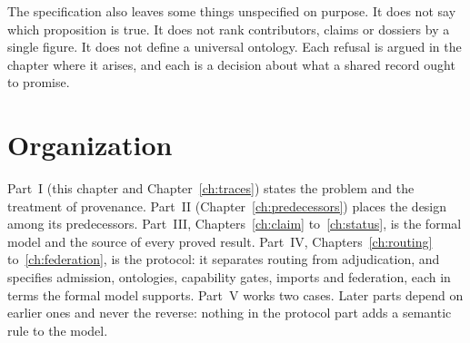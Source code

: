 The specification also leaves some things unspecified on purpose. It does not say which proposition is true. It does not rank contributors, claims or dossiers by a single figure. It does not define a universal ontology. Each refusal is argued in the chapter where it arises, and each is a decision about what a shared record ought to promise.

\section{Organization}\label{sec:organization}

Part~I (this chapter and Chapter~\ref{ch:traces}) states the problem and the treatment of provenance. Part~II (Chapter~\ref{ch:predecessors}) places the design among its predecessors. Part~III, Chapters~\ref{ch:claim} to~\ref{ch:status}, is the formal model and the source of every proved result. Part~IV, Chapters~\ref{ch:routing} to~\ref{ch:federation}, is the protocol: it separates routing from adjudication, and specifies admission, ontologies, capability gates, imports and federation, each in terms the formal model supports. Part~V works two cases. Later parts depend on earlier ones and never the reverse: nothing in the protocol part adds a semantic rule to the model.

